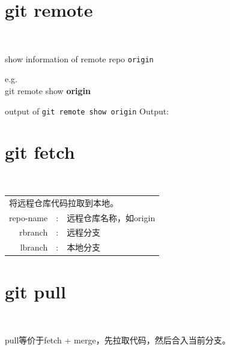 ﻿\documentclass{beamer}
\begin{document}
\section[git remote]{git remote}
\begin{frame}{\ {}}
\end{frame}
\begin{frame}{show information of remote repo \texttt{origin}}
\begin{framedtext}
{
  e.g.\\[5pt]
  git remote show \textbf{origin}
}
\end{framedtext}
\end{frame}
\begin{frame}{output of \texttt{git remote show origin}}
  \textcolor{blue!50}{\ttfamily Output:}
  
\end{frame}


\section[git fetch]{git fetch}
\begin{frame}{\ {}}
\begin{center}
{\small\ttfamily
  \begin{tabular}{rcl}
    \multicolumn{3}{l}{将远程仓库代码拉取到本地。} \\[10pt]
    repo-name & : & 远程仓库名称，如origin \\
    rbranch   & : & 远程分支 \\
    lbranch   & : & 本地分支 \\
  \end{tabular}
}
\end{center}
\end{frame}


\section[git pull]{git pull}
\begin{frame}{\ {}}
\begin{center}
  \begin{minipage}{0.7\textwidth}
    \ttfamily
    pull等价于fetch + merge，先拉取代码，然后合入当前分支。
  \end{minipage}
\end{center}
\end{frame}
\end{document}

